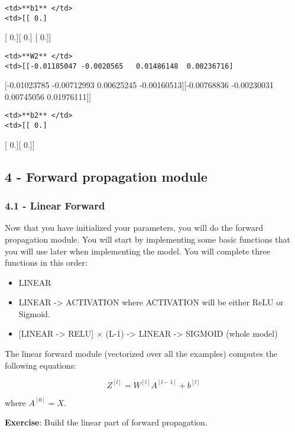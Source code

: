 \documentclass[11pt]{article}
\providecommand{\tightlist}{%
      \setlength{\itemsep}{0pt}\setlength{\parskip}{0pt}}
\begin{document}
\begin{verbatim}
<td>**b1** </td>
<td>[[ 0.]
\end{verbatim}

{[} 0.{]}{[} 0.{]} {[} 0.{]}{]}

\begin{verbatim}
<td>**W2** </td>
<td>[[-0.01185047 -0.0020565   0.01486148  0.00236716]
\end{verbatim}

{[}-0.01023785 -0.00712993 0.00625245 -0.00160513{]}{[}-0.00768836
-0.00230031 0.00745056 0.01976111{]}{]}

\begin{verbatim}
<td>**b2** </td>
<td>[[ 0.]
\end{verbatim}

{[} 0.{]}{[} 0.{]}{]}

    \subsection{4 - Forward propagation
module}\label{forward-propagation-module}

\subsubsection{4.1 - Linear Forward}\label{linear-forward}

Now that you have initialized your parameters, you will do the forward
propagation module. You will start by implementing some basic functions
that you will use later when implementing the model. You will complete
three functions in this order:

\begin{itemize}
\tightlist
\item
  LINEAR
\item
  LINEAR -\textgreater{} ACTIVATION where ACTIVATION will be either ReLU
  or Sigmoid.
\item
  {[}LINEAR -\textgreater{} RELU{]} \(\times\) (L-1) -\textgreater{}
  LINEAR -\textgreater{} SIGMOID (whole model)
\end{itemize}

The linear forward module (vectorized over all the examples) computes
the following equations:

\[Z^{[l]} = W^{[l]}A^{[l-1]} +b^{[l]}\tag{4}\]

where \(A^{[0]} = X\).

\textbf{Exercise}: Build the linear part of forward propagation.
\end{document}
